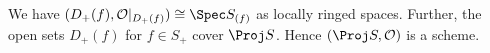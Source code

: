We have $(D_+(f), \mathcal{O}|_{D_+(f)}) \cong \Spec S_{(f)}$ as locally ringed
spaces. Further, the open sets $D_+(f)$ for $f \in S_+$ cover $\Proj S$. Hence
$(\Proj S, \mathcal{O})$ is a scheme.
